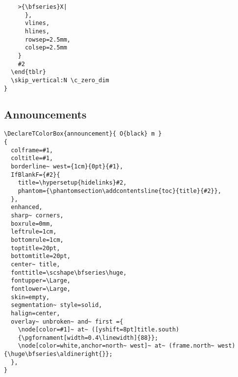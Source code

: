 \documentclass{letgut}
\begin{document}
\begin{lstlisting}
	>{\bfseries}X|
      },
      vlines,
      hlines,
      rowsep=2.5mm,
      colsep=2.5mm
    }
    #2
  \end{tblr}
  \skip_vertical:N \c_zero_dim
}
\end{lstlisting}

\subsection{Announcements}
\label{ImplementationAnnounces-nahckb909pj0}
\begin{lstlisting}
\DeclareTColorBox{announcement}{ O{black} m }
{
  colframe=#1,
  coltitle=#1,
  borderline~ west={1cm}{0pt}{#1},
  IfBlankF={#2}{
    title=\hypersetup{hidelinks}#2,
    phantom={\phantomsection\addcontentsline{toc}{title}{#2}},
  },
  enhanced,
  sharp~ corners,
  boxrule=0mm,
  leftrule=1cm,
  bottomrule=1cm,
  toptitle=20pt,
  bottomtitle=20pt,
  center~ title,
  fonttitle=\scshape\bfseries\huge,
  fontupper=\Large,
  fontlower=\Large,
  skin=empty,
  segmentation~ style=solid,
  halign=center,
  overlay~ unbroken~ and~ first ={
    \node[color=#1]~ at~ ([yshift=8pt]title.south)
    {\pgfornament[width=0.4\linewidth]{88}};
    \node[color=white,anchor=north~ west]~ at~ (frame.north~ west) {\huge\bfseries\aldineright{}};
  },
}
\end{lstlisting}
\end{document}
